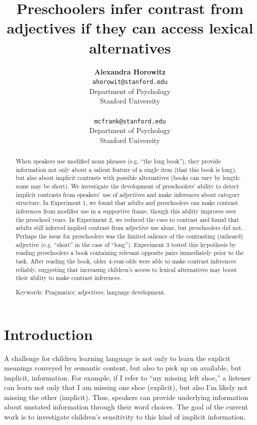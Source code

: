 \documentclass[10pt,letterpaper]{article}
\title{Preschoolers infer contrast from adjectives if they can access lexical alternatives}
\author{{\large \bf Alexandra Horowitz} \\ \texttt{ahorowit@stanford.edu}\\ Department of Psychology \\ Stanford University \\ 
\And {\large \bf Michael C. Frank} \\ \texttt{mcfrank@stanford.edu} \\ Department of Psychology \\ Stanford University \\ }
\begin{document}
\maketitle

\begin{abstract} 

When speakers use modified noun phrases (e.g. ``the long book''), they provide information not only about a salient feature of a single item (that this book is long), but also about implicit contrasts with possible alternatives (books can vary by length: some may be short).  We investigate the development of preschoolers' ability to detect implicit contrasts from speakers' use of adjectives and make inferences about category structure.  In Experiment 1, we found that adults and preschoolers can make contrast inferences from modifier use in a supportive frame, though this ability improves over the preschool years.  In Experiment 2, we reduced the cues to contrast and found that adults still inferred implied contrast from adjective use alone, but preschoolers did not.  Perhaps the issue for preschoolers was the limited salience of the contrasting (unheard) adjective (e.g. ``short'' in the case of ``long''). Experiment 3 tested this hypothesis by reading preschoolers a book containing relevant opposite pairs immediately prior to the task.  After reading the book, older 4-year-olds were able to make contrast inferences reliably, suggesting that increasing children's access to lexical alternatives may boost their ability to make contrast inferences.

{Keywords:} Pragmatics; adjectives; language development. 
\end{abstract}

\section{Introduction}

A challenge for children learning language is not only to learn the explicit meanings conveyed by semantic content, but also to pick up on available, but implicit, information.  For example, if I refer to ``my missing left shoe,'' a listener can learn not only that I am missing one shoe (explicit), but also I'm likely not missing the other (implicit).  Thus, speakers can provide underlying information about unstated information through their word choices.  The goal of the current work is to investigate children's sensitivity to this kind of implicit information. 
\end{document}
